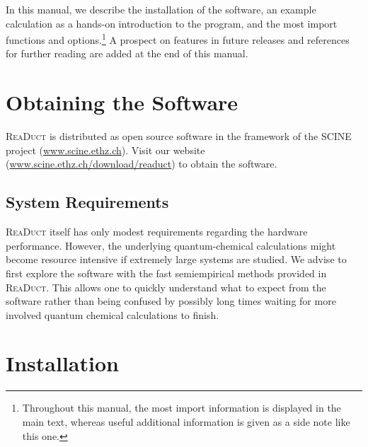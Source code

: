 \documentclass[]{tufte-book}
\begin{document}
In this manual, we describe the installation of the software, an example calculation as a hands-on 
introduction to the program, and the most import functions and options.\footnote{Throughout this manual, the most 
import information is displayed in the main text, whereas useful additional information is given as a side note like this one.}
A prospect on features in future releases and references for further reading are added at the end of this manual.\enlargethispage{\baselineskip}



\chapter{Obtaining the Software}
\label{ch:obtain}

\textsc{ReaDuct}  is distributed as open source software in the framework of the SCINE project (\href{https://scine.ethz.ch/}{www.scine.ethz.ch}).
Visit our website (\href{https://scine.ethz.ch/download/readuct}{www.scine.ethz.ch/download/readuct}) to obtain the software. 


\section{System Requirements}

\textsc{ReaDuct} itself has only modest requirements regarding the hardware performance. However, the underlying quantum-chemical 
calculations might become resource intensive if extremely large systems are studied. We advise to first explore the software with 
the fast semiempirical methods provided in \textsc{ReaDuct}. This allows one to quickly understand what to expect from the software 
rather than being confused by possibly long times waiting for more involved quantum chemical calculations to finish.



\chapter{Installation}\label{ch:installation}
\end{document}
